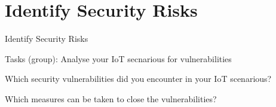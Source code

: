﻿\withsectionpage
\section{Identify Security Risks}

\begin{frame}{Identify Security Risks}
\begin{exampleblock}{Tasks (group): Analyse your IoT secnarious for vulnerabilities}
  \begin{description}[???]
    \item[???] Which security vulnerabilities did you encounter in your IoT scenarious?
    \item[???] Which measures can be taken to close the vulnerabilities?
  \end{description}
\end{exampleblock}
\end{frame}
